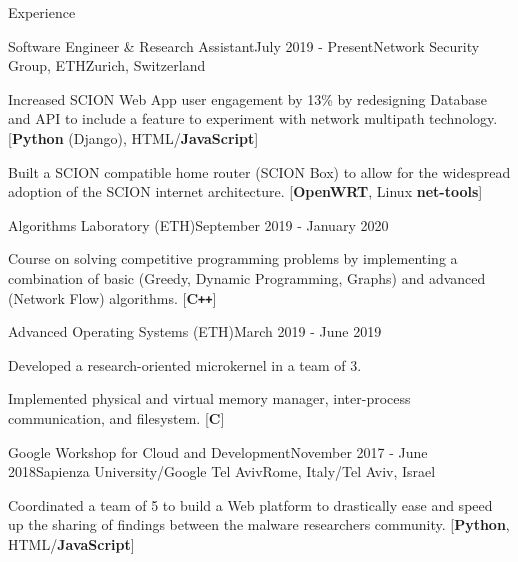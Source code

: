 \documentclass{resume}
\begin{document}
\begin{rSection}{Experience}

  \begin{rSubsection}{Software Engineer \& Research Assistant}{July 2019 - Present}{Network Security Group, ETH}{Zurich, Switzerland}
  \item Increased SCION Web App user engagement by 13\% by redesigning Database and API to include a feature to experiment with network multipath technology.  [\textbf{Python} (Django), HTML/\textbf{JavaScript}]
  \item Built a SCION compatible home router (SCION Box) to allow for the widespread adoption of the SCION internet architecture. [\textbf{OpenWRT}, Linux \textbf{net-tools}]
  \end{rSubsection}
  \begin{rSubsection}{Algorithms Laboratory (ETH)}{September 2019 - January 2020}{}{}
  \item Course on solving competitive programming problems by implementing a combination of basic (Greedy, Dynamic Programming, Graphs) and advanced (Network Flow) algorithms. [\textbf{C\texttt{++}}]
  \end{rSubsection}
  \begin{rSubsection}{Advanced Operating Systems (ETH)}{March 2019 - June 2019}{}{}
  \item Developed a research-oriented microkernel in a team of 3.
  \item Implemented physical and virtual memory manager, inter-process communication, and filesystem. [\textbf{C}]
  \end{rSubsection}
  \begin{rSubsection}{Google Workshop for Cloud and Development}{November 2017 - June 2018}{Sapienza University/Google Tel Aviv}{Rome, Italy/Tel Aviv, Israel}
  \item Coordinated a team of 5 to build a Web platform to drastically ease and speed up the sharing of findings between the malware researchers community. [\textbf{Python}, HTML/\textbf{JavaScript}]
  \end{rSubsection}

\end{rSection}

\end{document}
